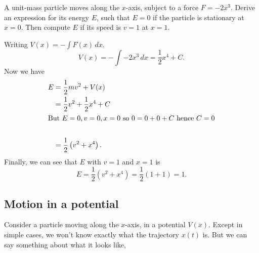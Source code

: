 \documentclass[10pt, a4paper]{article}
\begin{document}
\begin{example}
    A unit-mass particle moves along the $x$-axis,
    subject to a force $F = -2x ^ 3$.
    Derive an expression for its energy $E$,
    such that $E = 0$ if the particle is stationary at $x = 0$.
    Then compute $E$ if its speed is $v = 1$ at $x = 1$.
    \begin{solution}
        Writing $V(x) = -\int F(x)\,dx$.
        \[
        V(x) = -\int -2x ^ 3\,dx = \frac{1}{2}x ^ 4 + C.
        \]
        Now we have
        \begin{align*}
            E &= \frac{1}{2}mv ^ 2 + V(x) \\
            &= \frac{1}{2}v ^ 2 + \frac{1}{2}x ^ 4 + C \\
            \intertext{But $E = 0, v = 0, x = 0$ so $0 = 0 + 0 + C$ hence $C = 0$} \\
            &= \frac{1}{2}\left(v ^ 2 + x ^ 4\right).
        \end{align*}
        Finally,
        we can see that $E$ with $v = 1$ and $x = 1$ is
        \[
        E = \frac{1}{2}\left(v ^ 2 + x ^ 4\right) = \frac{1}{2}(1 + 1) = 1.
        \]
    \end{solution}
\end{example}

\subsection{Motion in a potential}
Consider a particle moving along the $x$-axis,
in a potential $V(x)$.
Except in simple cases,
we won't know exactly what the trajectory $x(t)$ is.
But we can say something about what it looks like,
\end{document}
